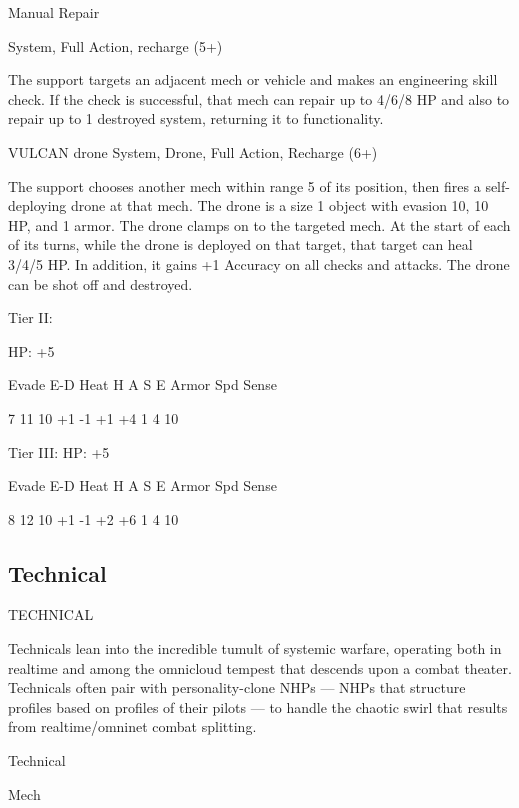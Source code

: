 Manual Repair
 
System, Full Action, recharge (5+)
 
The support targets an adjacent mech or vehicle and makes an engineering skill check. If the  
check is successful, that mech can repair up to 4/6/8 HP and also to repair up to 1 destroyed  
system, returning it to functionality.
 

VULCAN drone  
System, Drone, Full Action, Recharge (6+)
 
The support chooses another mech within range 5 of its position, then fires a self-deploying  
drone at that mech. The drone is a size 1 object with evasion 10, 10 HP, and 1 armor. The drone  
clamps on to the targeted mech. At the start of each of its turns, while the drone is deployed on  
that target, that target can heal 3/4/5 HP. In addition, it gains +1 Accuracy on all checks and  
attacks. The drone can be shot off and destroyed.
 

Tier II:
 
HP: +5
 

          Evade    E-D    Heat     H    A     S     E       Armor        Spd      Sense 

          7        11     10       +1   -1    +1    +4      1            4        10 

Tier III:  
HP: +5
 

          Evade    E-D    Heat     H    A     S     E       Armor        Spd      Sense 

          8        12     10       +1   -1    +2    +6      1            4        10 

                                                                                                                

\subsection{Technical}
                                              TECHNICAL  

Technicals lean into the incredible tumult of systemic warfare, operating both in realtime and  
among the omnicloud tempest that descends upon a combat theater. Technicals often pair with  
personality-clone NHPs — NHPs that structure profiles based on profiles of their pilots — to  
handle the chaotic swirl that results from realtime/omninet combat splitting.   

 Technical 

 Mech 

